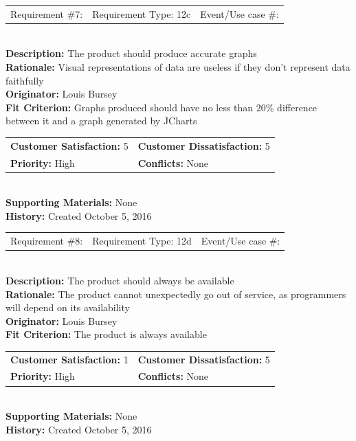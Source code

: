 \documentclass[12pt, titlepage]{article}
\begin{document}
%
%
\begin{reqbox}
\begin{tabular}{ccc}
Requirement \#7: & Requirement Type: 12c & Event/Use case \#: \\
\end{tabular} \\
\textbf{Description:} The product should produce accurate graphs \\
\textbf{Rationale:} Visual representations of data are useless if they don't represent data faithfully \\
\textbf{Originator:} Louis Bursey\\
\textbf{Fit Criterion:}  Graphs produced should have no less than 20\% difference between it and a graph generated by JCharts  \\
\begin{tabular}{ll}
\textbf{Customer Satisfaction:} 5 & \textbf{Customer Dissatisfaction:} 5 \\
\textbf{Priority:} High & \textbf{Conflicts:} None\\
\end{tabular} \\
\textbf{Supporting Materials:} None \\
\textbf{History:} Created October 5, 2016
\end{reqbox}
%
%
\begin{reqbox}
\begin{tabular}{ccc}
Requirement \#8: & Requirement Type: 12d & Event/Use case \#: \\
\end{tabular} \\
\textbf{Description:} The product should always be available \\
\textbf{Rationale:} The product cannot unexpectedly go out of service, as programmers will depend on its availability \\
\textbf{Originator:} Louis Bursey\\
\textbf{Fit Criterion:}  The product is always available  \\
\begin{tabular}{ll}
\textbf{Customer Satisfaction:} 1 & \textbf{Customer Dissatisfaction:} 5 \\
\textbf{Priority:} High & \textbf{Conflicts:} None\\
\end{tabular} \\
\textbf{Supporting Materials:} None \\
\textbf{History:} Created October 5, 2016
\end{reqbox}
\end{document}
